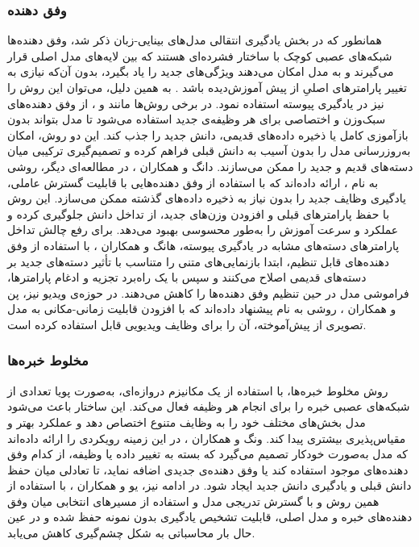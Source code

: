 \subsubsection{وفق دهنده}
همانطور که در بخش یادگیری انتقالی مدل‌های بینایی-زبان ذکر شد، وفق دهنده‌ها شبکه‌های عصبی کوچک با ساختار فشرده‌ای هستند که بین لایه‌های مدل اصلی قرار می‌گیرند و به مدل امکان می‌دهند ویژگی‌های جدید را یاد بگیرد، بدون آن‌که نیازی به تغییر پارامتر‌های اصلیِ از پیش آموزش‌دیده باشد \cite{llm_continual}. به همین دلیل، می‌توان این روش را نیز در یادگیری پیوسته استفاده نمود. در برخی روش‌ها مانند 
\cite{dia-adapter-2025}
و 
\cite{ease-adapter-2024}،
از وفق دهنده‌های سبک‌وزن و اختصاصی برای هر وظیفه‌ی جدید استفاده می‌شود تا مدل بتواند بدون بازآموزی کامل یا ذخیره داده‌های قدیمی، دانش جدید را جذب کند. این دو روش، امکان به‌روزرسانی مدل را بدون آسیب به دانش قبلی فراهم کرده و تصمیم‌گیری ترکیبی میان دسته‌های قدیم و جدید را ممکن می‌سازند. دانگ و همکاران 
\cite{cada-adapter-2025}،
در مطالعه‌ای دیگر، روشی به نام ، ارائه داده‌اند که با استفاده از وفق دهنده‌هایی با قابلیت گسترش عاملی، یادگیری وظایف جدید را بدون نیاز به ذخیره داده‌های گذشته ممکن می‌سازد. این روش با حفظ پارامتر‌های قبلی و افزودن وزن‌های جدید، از تداخل دانش جلوگیری کرده و عملکرد و سرعت آموزش را به‌طور محسوسی بهبود می‌دهد. برای رفع چالش تداخل پارامتر‌های دسته‌های مشابه در یادگیری پیوسته، هانگ و همکاران 
\cite{rapf-adapter-2024}،
با استفاده از وفق دهنده‌های قابل تنظیم، ابتدا بازنمایی‌های متنی را متناسب با تأثیر دسته‌های جدید بر دسته‌های قدیمی اصلاح می‌کنند و سپس با یک راه‌برد تجزیه و ادغام پارامتر‌ها، فراموشی مدل در حین تنظیم وفق دهنده‌ها را کاهش می‌دهند. در حوزه‌ی ویدیو نیز، پن و همکاران 
\cite{st-adapter-2022}،
روشی به نام  پیشنهاد داده‌اند که با افزودن قابلیت زمانی-مکانی به مدل‌ تصویری از پیش‌آموخته، آن را برای وظایف ویدیویی قابل استفاده کرده است. 
 
\subsubsection{مخلوط خبره‌ها}
 روش مخلوط خبره‌ها، با استفاده از یک مکانیزم دروازه‌ای، به‌صورت پویا تعدادی از شبکه‌های عصبی خبره را برای انجام هر وظیفه فعال می‌کند. این ساختار باعث می‌شود مدل بخش‌های مختلف خود را به وظایف متنوع اختصاص دهد و عملکرد بهتر و مقیاس‌پذیری بیشتری پیدا کند. ونگ و همکاران 
\cite{sema-2024}،
در این زمینه رویکردی را ارائه داده‌اند که مدل به‌صورت خودکار تصمیم می‌گیرد که بسته به تغییر داده یا وظیفه، از کدام وفق دهنده‌های موجود استفاده کند یا وفق دهنده‌ی جدیدی اضافه نماید، تا تعادلی میان حفظ دانش قبلی و یادگیری دانش جدید ایجاد شود. در ادامه نیز، یو و همکاران 
\cite{ddas-2024}،
با استفاده از همین روش و با گسترش تدریجی مدل  و استفاده از مسیرهای انتخابی میان وفق دهنده‌های خبره و مدل اصلی، قابلیت تشخیص یادگیری بدون نمونه حفظ شده و در عین حال بار محاسباتی به شکل چشم‌گیری کاهش می‌یابد.


